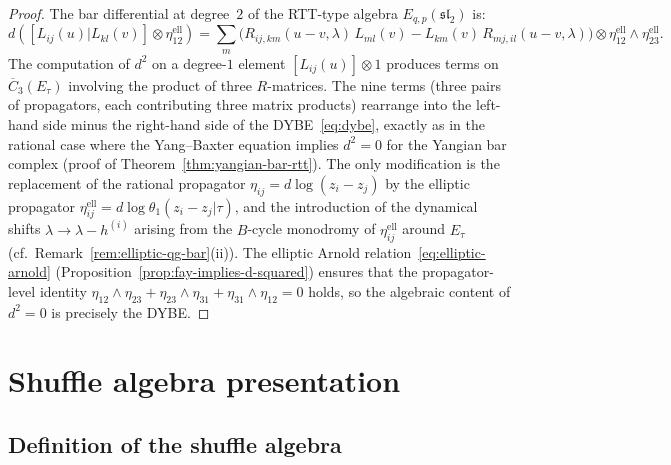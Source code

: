 \begin{proof}
The bar differential at degree~$2$ of the RTT-type algebra
$E_{q,p}(\mathfrak{sl}_2)$ is:
\[
d([L_{ij}(u) | L_{kl}(v)] \otimes \eta_{12}^{\mathrm{ell}})
= \sum_m \bigl(
R_{ij,km}(u{-}v,\lambda)\,L_{ml}(v)
- L_{km}(v)\,R_{mj,il}(u{-}v,\lambda)
\bigr) \otimes \eta_{12}^{\mathrm{ell}} \wedge \eta_{23}^{\mathrm{ell}}.
\]
The computation of $d^2$ on a degree-$1$ element
$[L_{ij}(u)] \otimes 1$ produces terms on
$\overline{C}_3(E_\tau)$ involving the product of three
$R$-matrices. The nine terms (three pairs of propagators,
each contributing three matrix products) rearrange into
the left-hand side minus the right-hand side of
the DYBE~\eqref{eq:dybe}, exactly as in the rational case
where the Yang--Baxter equation implies $d^2 = 0$
for the Yangian bar complex
(proof of Theorem~\ref{thm:yangian-bar-rtt}).
The only modification is the replacement of the rational
propagator $\eta_{ij} = d\log(z_i - z_j)$ by the elliptic
propagator $\eta_{ij}^{\mathrm{ell}}
= d\log\theta_1(z_i - z_j|\tau)$, and the introduction
of the dynamical shifts $\lambda \to \lambda - h^{(i)}$
arising from the $B$-cycle monodromy of
$\eta^{\mathrm{ell}}_{ij}$ around $E_\tau$
(cf.\ Remark~\ref{rem:elliptic-qg-bar}(ii)).
The elliptic Arnold relation~\eqref{eq:elliptic-arnold}
(Proposition~\ref{prop:fay-implies-d-squared}) ensures that
the propagator-level identity $\eta_{12} \wedge \eta_{23}
+ \eta_{23} \wedge \eta_{31} + \eta_{31} \wedge \eta_{12}
= 0$ holds, so the algebraic content of $d^2 = 0$ is
precisely the DYBE.
\end{proof}


\section{Shuffle algebra presentation}
\label{sec:shuffle-algebra}

\subsection{Definition of the shuffle algebra}
\label{subsec:shuffle-def}

